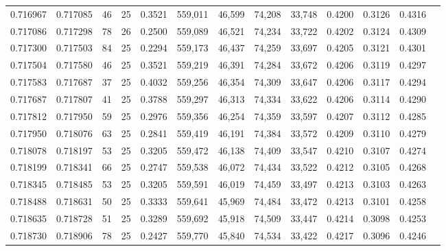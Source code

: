 \begin{tabular}{rrrrrrrrrrrrr}
0.716967 & 0.717085 &    46 &  25 &                                     0.3521 & 559,011 &  46,599 &  74,208 &  33,748 & 0.4200 & 0.3126 & 0.4316 \\
0.717086 & 0.717298 &    78 &  26 &                                     0.2500 & 559,089 &  46,521 &  74,234 &  33,722 & 0.4202 & 0.3124 & 0.4309 \\
0.717300 & 0.717503 &    84 &  25 &                                     0.2294 & 559,173 &  46,437 &  74,259 &  33,697 & 0.4205 & 0.3121 & 0.4301 \\
0.717504 & 0.717580 &    46 &  25 &                                     0.3521 & 559,219 &  46,391 &  74,284 &  33,672 & 0.4206 & 0.3119 & 0.4297 \\
0.717583 & 0.717687 &    37 &  25 &                                     0.4032 & 559,256 &  46,354 &  74,309 &  33,647 & 0.4206 & 0.3117 & 0.4294 \\
0.717687 & 0.717807 &    41 &  25 &                                     0.3788 & 559,297 &  46,313 &  74,334 &  33,622 & 0.4206 & 0.3114 & 0.4290 \\
0.717812 & 0.717950 &    59 &  25 &                                     0.2976 & 559,356 &  46,254 &  74,359 &  33,597 & 0.4207 & 0.3112 & 0.4285 \\
0.717950 & 0.718076 &    63 &  25 &                                     0.2841 & 559,419 &  46,191 &  74,384 &  33,572 & 0.4209 & 0.3110 & 0.4279 \\
0.718078 & 0.718197 &    53 &  25 &                                     0.3205 & 559,472 &  46,138 &  74,409 &  33,547 & 0.4210 & 0.3107 & 0.4274 \\
0.718199 & 0.718341 &    66 &  25 &                                     0.2747 & 559,538 &  46,072 &  74,434 &  33,522 & 0.4212 & 0.3105 & 0.4268 \\
0.718345 & 0.718485 &    53 &  25 &                                     0.3205 & 559,591 &  46,019 &  74,459 &  33,497 & 0.4213 & 0.3103 & 0.4263 \\
0.718488 & 0.718631 &    50 &  25 &                                     0.3333 & 559,641 &  45,969 &  74,484 &  33,472 & 0.4213 & 0.3101 & 0.4258 \\
0.718635 & 0.718728 &    51 &  25 &                                     0.3289 & 559,692 &  45,918 &  74,509 &  33,447 & 0.4214 & 0.3098 & 0.4253 \\
0.718730 & 0.718906 &    78 &  25 &                                     0.2427 & 559,770 &  45,840 &  74,534 &  33,422 & 0.4217 & 0.3096 & 0.4246 \\

\end{tabular}
